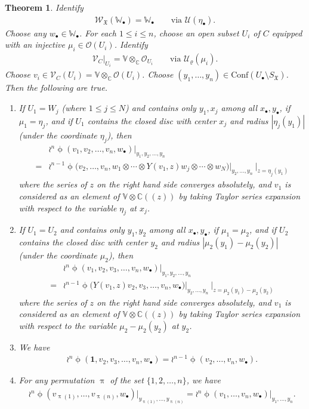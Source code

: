 \documentclass[12pt,a4paper,notitlepage]{article}
\theoremstyle{definition}
\theoremstyle{plain}
\newtheorem{thm}[df]{Theorem}
\newcommand{\fk}{\mathfrak}
\newcommand{\mc}{\mathcal}
\newcommand{\id}{\mathbf{1}}
\newcommand{\Conf}{\mathrm{Conf}}
\newcommand{\scr}{\mathscr}
\newcommand{\SX}{{S_{\fk X}}}
\newcommand{\blt}{\bullet}
\newcommand{\Vbb}{\mathbb V}
\newcommand{\Wbb}{\mathbb W}
\newcommand{\Cbb}{\mathbb C}
\numberwithin{equation}{section}
\begin{document}
\begin{thm}\label{lb17}
Identify
\begin{align*}
\scr W_{\fk X}(\Wbb_\blt)=\Wbb_\blt	\qquad\text{via }\mc U(\eta_\blt).
\end{align*}
Choose any $w_\blt\in\Wbb_\blt$. For each $1\leq i\leq n$, choose an open subset  $U_i$  of $C$ equipped with an injective $\mu_i\in\scr O(U_i)$. Identify 
\begin{align*}
\scr V_C\big|_{U_i}=\Vbb\otimes_\Cbb\scr O_{U_i}\qquad\text{via }\mc U_\varrho(\mu_i).
\end{align*}
Choose $v_i\in\scr V_C(U_i)=\Vbb\otimes_\Cbb\scr O(U_i)$. Choose $(y_1,\dots,y_n)\in\Conf(U_\blt\setminus\SX)$. Then the following are true.
\begin{enumerate}[label=(\arabic*)]
\item If $U_1=W_j$ (where $1\leq j\leq N$) and contains only $y_1,x_j$ among all $x_\blt,y_\blt$, if $\mu_1=\eta_j$, and if $U_1$ contains the closed disc with center $x_j$ and radius $|\eta_j(y_1)|$ (under the coordinate $\eta_j$), then
\begin{align}
&\wr^n\upphi(v_1,v_2,\dots,v_n,w_\blt)\big|_{y_1,y_2,\dots,y_n}\nonumber\\
=&\wr^{n-1}\upphi\big(v_2,\dots,v_n,w_1\otimes\cdots\otimes Y(v_1,z)w_j\otimes\cdots\otimes w_N\big)\big|_{y_2,\dots,y_n}~\big|_{z=\eta_j(y_1)}\label{eq35}
\end{align}
where the series of $z$ on the right hand side converges absolutely, and $v_1$ is considered as an element of $\Vbb\otimes\Cbb((z))$ by taking Taylor series expansion with respect to the variable $\eta_j$ at $x_j$.
\item If $U_1=U_2$ and contains only $y_1,y_2$ among all $x_\blt,y_\blt$, if $\mu_1=\mu_2$, and if $U_2$ contains the closed disc with center $y_2$ and radius $|\mu_2(y_1)-\mu_2(y_2)|$ (under the coordinate $\mu_2$), then
\begin{align}
&\wr^n\upphi(v_1,v_2,v_3,\dots,v_n,w_\blt)\big|_{y_1,y_2,\dots,y_n}\nonumber\\
=&\wr^{n-1}\upphi\big(Y(v_1,z)v_2,v_3,\dots,v_n,w_\blt\big)\big |_{y_2,\dots,y_n}~\big |_{z=\mu_2(y_1)-\mu_2(y_2)}\label{eq36}
\end{align}
where the series of $z$ on the right hand side converges absolutely, and $v_1$ is considered as an element of $\Vbb\otimes\Cbb((z))$ by taking Taylor series expansion with respect to the variable $\mu_2-\mu_2(y_2)$ at $y_2$.
\item  We have
\begin{align}
\wr^n\upphi(\id,v_2,v_3,\dots,v_n,w_\blt)=\wr^{n-1}\upphi(v_2,\dots,v_n,w_\blt).
\end{align}
\item For any permutation $\uppi$ of the set $\{1,2,\dots,n\}$, we have
\begin{align}
\wr^n\upphi(v_{\uppi(1)},\dots,v_{\uppi(n)},w_\blt)\big|_{y_{\uppi(1)},\dots,y_{\uppi(n)}}=\wr^n\upphi(v_1,\dots,v_n,w_\blt)\big|_{y_1,\dots,y_n}.
\end{align}
\end{enumerate}
\end{thm}
\end{document}
